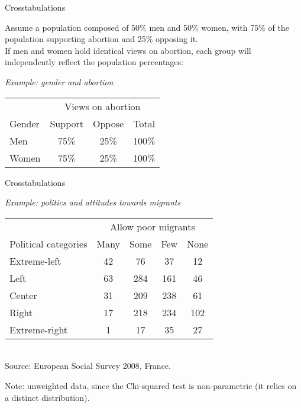 \documentclass{beamer}
\begin{document}
	\begin{frame}[t]{Crosstabulations}
	
	Assume a population composed of 50\% men and 50\% women, with 75\% of the population supporting abortion and 25\% opposing it.\\[1em]

	If men and women hold identical views on abortion, each group will independently reflect the population percentages:\\[1em]
		
	\begin{center}
	\textit{Example: gender and abortion}\\[1em]
	\begin{tabular}{lccc}
	\toprule
	& \multicolumn{3}{c}{Views on abortion}	\\
	\cmidrule(r){2-4}
	Gender & Support & Oppose & Total\\
	\cmidrule(r){1-4}
	Men	  & 75\%	& 25\% 	& 100\%\\
	Women & 75\%  	& 25\%	& 100\%\\
	\bottomrule
	\end{tabular}
	\end{center}

		
	\end{frame}
	
	\begin{frame}[t]{Crosstabulations}
	
	\begin{center}\vspace{-1em}
	\textit{Example: politics and attitudes towards migrants}\\[1em]
	\begin{tabular}{lcccc}
	\toprule
	& \multicolumn{4}{c}{Allow poor migrants}	\\
	\cmidrule(r){2-5}
	Political categories & Many & Some	& Few & None\\
	\cmidrule(r){1-5}
	Extreme-left	& 42	 & 76 		& 37	 & 12 \\
	Left	 		& 63  & 284	& 161	 & 46\\
	Center	 		& 31  & 209	& 238	 & 61\\
	Right	 		& 17	 & 218	& 234	 & 102\\
	Extreme-right	& 1	 & 17	 	& 35	 & 27\\
	\bottomrule
	\end{tabular}
	\\
	\vspace{.5em}
	Source: European Social Survey 2008, France.\\[1em]
	\end{center}
	
	Note: unweighted data, since the Chi-squared test is non-parametric (it relies on a distinct distribution).
	
	\end{frame}
	
\end{document}
